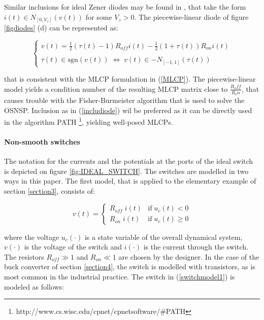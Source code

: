\documentclass{article}
\def\geq{\geqslant}
\begin{document}
Similar inclusions for ideal Zener diodes may be found in \cite{acary-brogliato2008,addi2009}, that take the form $i(t) \in N_{[0,V_{z}]}(v(t))$ for some $V_{z} >0$. The piecewise-linear  diode of figure \ref{figdiodes} (d) can be represented as:


\begin{equation}\label{includiode2}
\left\{\begin{array}{l}
v(t)=\frac{1}{2}(\tau(t)-1) R_{off} i(t) -\frac{1}{2}(1+\tau(t)) R_{on} i(t) \\ \\ \tau(t) \in \mbox{sgn}(v(t))\; \Leftrightarrow \; v(t) \in - N_{[-1,1]}(\tau(t))
\end{array}\right.
\end{equation}

that is consistent with the MLCP formulation in (\ref{MLCP}). The piecewise-linear model yields a condition number of the resulting MLCP matrix close to $\frac{R_off}{R_on}$, that causes trouble with the Fisher-Burmeister algorithm that is used to solve the OSNSP. Inclusion as in (\ref{includiode})  wil be preferred as it can be directly used in the algorithm PATH \footnote{http://www.cs.wisc.edu/cpnet/cpnetsoftware/$\#$PATH}, yielding well-posed MLCPs. 



\paragraph{Non-smooth switches}  The notation for the currents and the potentials at the ports of the ideal switch is depicted on figure \ref{fig:IDEAL_SWITCH}. The switches are modelled in two ways in this paper. The first model, that is applied to the elementary example of section \ref{section3}, consists of:

\begin{equation}\label{switchmodel1}
v(t)=\left\{\begin{array}{ll} R_{off}\; i(t) & \mbox{if}\;u_{c}(t) < 0 \\   R_{on}\; i(t) & \mbox{if}\;u_{c}(t) \geq  0  \end{array}\right.
\end{equation} 

where the voltage $u_{c}(\cdot)$ is a state variable of the overall dynamical system, $v(\cdot)$ is the voltage of the switch and $i(\cdot)$ is the current through the switch. The resistors $R_{off} \gg 1$ and $R_{on} \ll 1$ are chosen by the designer. In the case of the buck converter of section \ref{section4}, the switch is modelled with transistors, as is most common in the industrial practice. The switch in (\ref{switchmodel1}) is modeled as follows:
\end{document}
